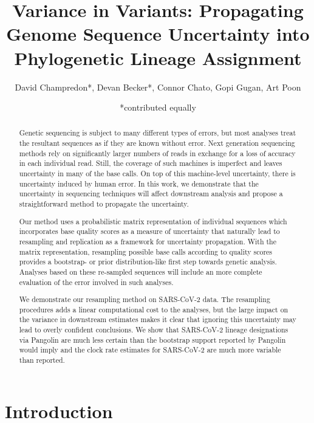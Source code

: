 \documentclass[10pt]{article}
\title{Variance in Variants: Propagating Genome Sequence Uncertainty
into Phylogenetic Lineage Assignment}
\author{David Champredon*, Devan Becker*, Connor Chato, Gopi Gugan, Art
Poon}
\date{*contributed equally}
\begin{document}
\maketitle

\normalsize
\vspace{1cm}
\tableofcontents

\begin{abstract}
Genetic sequencing is subject to many different types of errors, but most analyses treat the resultant sequences as if they are known without error. Next generation sequencing methods rely on significantly larger numbers of reads in exchange for a loss of accuracy in each individual read. Still, the coverage of such machines is imperfect and leaves uncertainty in many of the base calls. On top of this machine-level uncertainty, there is uncertainty induced by human error. In this work, we demonstrate that the uncertainty in sequencing techniques will affect downstream analysis and propose a straightforward method to propagate the uncertainty.

Our method uses a probabilistic matrix representation of individual sequences which incorporates base quality scores as a measure of uncertainty that naturally lead to resampling and replication as a framework for uncertainty propagation. With the matrix representation, resampling possible base calls according to quality scores provides a bootstrap- or prior distribution-like first step towards genetic analysis. Analyses based on these re-sampled sequences will include an more complete evaluation of the error involved in such analyses.

We demonstrate our resampling method on SARS-CoV-2 data. The resampling procedures adds a linear computational cost to the analyses, but the large impact on the variance in downstream estimates makes it clear that ignoring this uncertainty may lead to overly confident conclusions. We show that SARS-CoV-2 lineage designations via Pangolin are much less certain than the bootstrap support reported by Pangolin would imply and the clock rate estimates for SARS-CoV-2 are much more variable than reported.
\end{abstract}


\section{Introduction}
\end{document}
